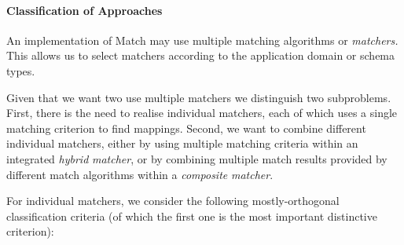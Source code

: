 \paragraph{Classification of Approaches}
An implementation of Match may use multiple matching algorithms or
\textit{matchers. }This allows us to select matchers according to the
application domain or schema types. 

Given that we want two use multiple matchers we distinguish two
subproblems. First, there is the need to realise individual matchers,
each of which uses a single matching criterion to find mappings.
Second, we want to combine different individual matchers, either by
using multiple matching criteria within an integrated \textit{hybrid}
\textit{matcher}, or by combining multiple match results provided by
different match algorithms within a \textit{composite}
\textit{matcher}. 

For individual matchers, we consider the following mostly-orthogonal
classification criteria (of which the first one is the most important
distinctive criterion): 

